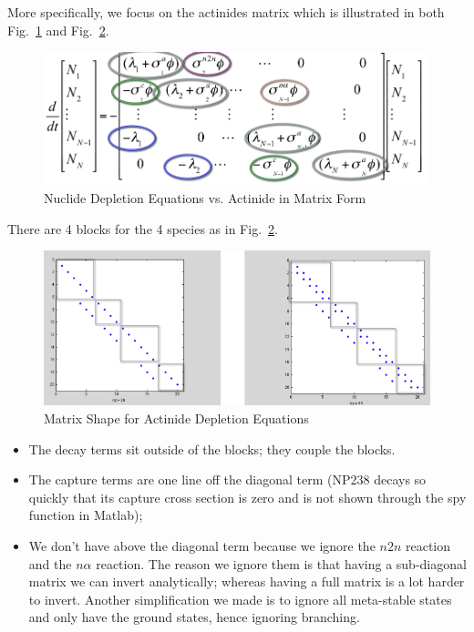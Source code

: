\documentclass{school-22.211-notes}
\begin{document}
More specifically, we focus on the actinides matrix which is illustrated in both Fig.~\ref{nuclide-depletion-matrix} and Fig.~\ref{actinide-block}. 
\begin{figure}[ht]
  \centering
  \includegraphics[width=5in]{images/dfs/nuclide-depletion-matrix-form.png}
  \caption{Nuclide Depletion Equations vs. Actinide in Matrix Form} \label{nuclide-depletion-matrix} 
    \end{figure}
There are 4 blocks for the 4 species as in Fig.~\ref{actinide-block}. 
\begin{figure}[ht]
  \centering
  \includegraphics[width=5in]{images/dfs/actinide-block.png}
  \caption{Matrix Shape for Actinide Depletion Equations} \label{actinide-block} 
    \end{figure}
\begin{itemize}
\item The decay terms sit outside of the blocks; they couple the blocks.
\item  The capture terms are one line off the diagonal term (NP238 decays so quickly that its capture cross section is zero and is not shown through the spy function in Matlab); 
\item We don't have above the diagonal term because we ignore the $n2n$ reaction and the $n \alpha$ reaction. The reason we ignore them is that having a sub-diagonal matrix we can invert analytically; whereas having a full matrix is a lot harder to invert. Another simplification we made is to ignore all meta-stable states and only have the ground states, hence ignoring branching. 
\end{itemize}
\end{document}
